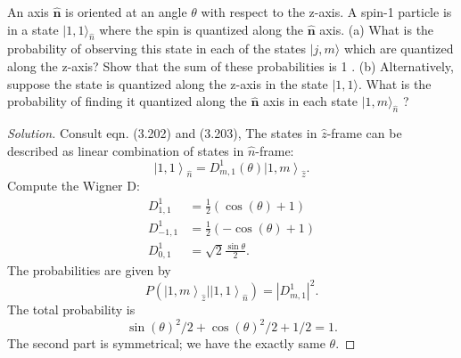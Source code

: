 \begin{problem}
	An axis $\widehat{\boldsymbol{n}}$ is oriented at an angle $\theta$ with respect to the z-axis. A spin-1 particle is in a state $|1,1\rangle_{\hat{n}}$ where the spin is quantized along the $\widehat{\boldsymbol{n}}$ axis.
(a) What is the probability of observing this state in each of the states $|j, m\rangle$ which are quantized along the z-axis? Show that the sum of these probabilities is 1 .
(b) Alternatively, suppose the state is quantized along the z-axis in the state $|1,1\rangle$. What is the probability of finding it quantized along the $\widehat{\boldsymbol{n}}$ axis in each state $|1, m\rangle_{\hat{n}}$ ?
\end{problem}
\begin{proof}[Solution]
	Consult eqn. (3.202) and (3.203), The states in  $\hat{z} $-frame can be described as linear combination of states in $\hat{n} $-frame:
	\[
		\left| 1,1 \right\rangle _{\hat{n} }
		= D_{m, 1}^1 (\theta) \left| 1, m \right\rangle_{\hat{z} }
	.\] 
	Compute the Wigner D:
	\begin{align*}
		D_{1, 1}^1 &= \frac{1}{2}\left( \cos(\theta) + 1 \right) \\
		D_{-1, 1}^1 &= \frac{1}{2}\left(- \cos(\theta) + 1 \right) \\
		D_{0, 1}^1 &= \sqrt{2} \frac{\sin \theta}{2} 
	.\end{align*}
	The probabilities are given by
	\[
		P\left( \left| 1, m \right\rangle _{\hat{z} } | \left| 1, 1 \right\rangle _{\hat{n} } \right) = \left| D_{m, 1}^1 \right|^2 
	.\] 
	The total probability is
	\[
		\sin(\theta)^2/2 + \cos(\theta)^2/2 + 1/2 = 1
	.\] 
	The second part is symmetrical; we have the exactly same $\theta$.
\end{proof}

